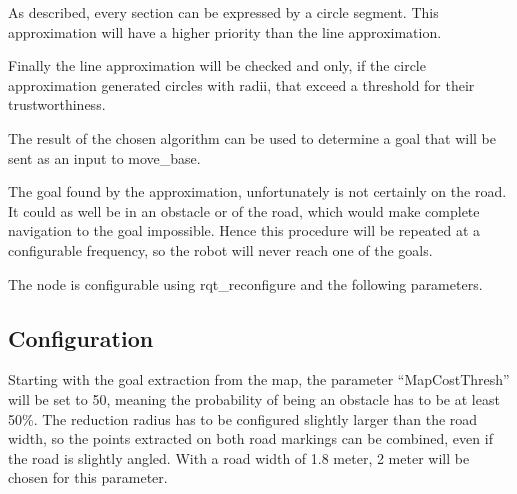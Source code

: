 As described, every section can be expressed by a circle segment. This approximation will have a higher priority than the line approximation.

Finally the line approximation will be checked and only, if the circle approximation generated circles with radii, that exceed a threshold for their trustworthiness.

The result of the chosen algorithm can be used to determine a goal that will be sent as an input to move\_base.

The goal found by the approximation, unfortunately is not certainly on the road. It could as well be in an obstacle or of the road, which would make complete navigation to the goal impossible. Hence this procedure will be repeated at a configurable frequency, so the robot will never reach one of the goals. 

The node is configurable using rqt\_reconfigure and the following parameters.

\begin{table} 
\centering
{}

\caption{PoseFinder parameters}
\label{posefinderparams}

\end{table}

\subsection{Configuration}


Starting with the goal extraction from the map, the parameter ``MapCostThresh'' will be set to 50, meaning the probability of being an obstacle has to be at least 50\%. The reduction radius has to be configured slightly larger than the road width, so the points extracted on both road markings can be combined, even if the road is slightly angled. With a road width of 1.8 meter, 2 meter will be chosen for this parameter.\\

